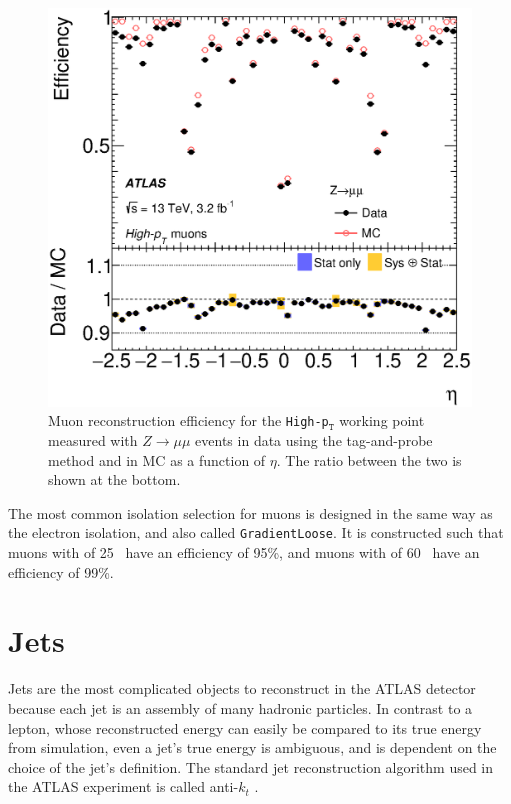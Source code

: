 \begin{centering}
\begin{figure}[!hbt]
\myfloatalign
\includegraphics[width=.9\linewidth]{figures/reco/fig_03c.eps}
\caption{Muon reconstruction efficiency for the \texttt{High-p$_\texttt{T}$} working point measured with $Z\rightarrow\mu\mu$ events in data using the tag-and-probe method and in \ac{MC} as a function of $\eta$. The ratio between the two is shown at the bottom. \cite{1603.05598} }
\label{fig:reco_muon_eta_highpt}
\end{figure}
\end{centering}

The most common isolation selection for muons is designed in the same way as the electron isolation, and also called \texttt{GradientLoose}. It is constructed such that muons with \pt of 25 \gev~have an efficiency of 95\%, and muons with \pt of 60 \gev~have an efficiency of 99\%. 

\section{Jets}
\label{sec:reco_jets}

Jets are the most complicated objects to reconstruct in the ATLAS detector because each jet is an assembly of many hadronic particles. In contrast to a lepton, whose reconstructed energy can easily be compared to its true energy from simulation, even a jet's true energy is ambiguous, and is dependent on the choice of the jet's definition. The standard jet reconstruction algorithm used in the ATLAS experiment is called anti-$k_t$ \cite{Cacciari:2008gp}. 

